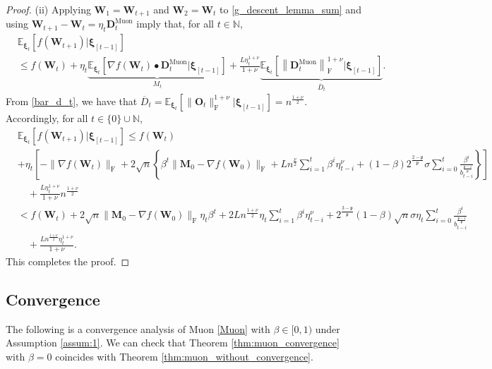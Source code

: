 \documentclass[twoside,11pt]{article}
\begin{document}
\begin{proof}
(ii) Applying $\bm{W}_1 = \bm{W}_{t+1}$ and $\bm{W}_2 = \bm{W}_t$ to \eqref{g_descent_lemma_sum} and using $\bm{W}_{t+1} - \bm{W}_t = \eta_t \bm{D}_t^{\mathrm{Muon}}$ imply that, for all $t \in \mathbb{N}$,
\begin{align*}
&\mathbb{E}_{\bm{\xi}_t} \left[ f(\bm{W}_{t+1})|\bm{\xi}_{[t-1]} \right]\\
&\leq 
f(\bm{W}_t) 
+ \eta_t 
\underbrace{\mathbb{E}_{\bm{\xi}_t} \left[ \nabla f (\bm{W}_t) \bullet \bm{D}_t^{\mathrm{Muon}} |\bm{\xi}_{[t-1]} \right]}_{M_t}
+ \frac{L \eta_t^{1 + \nu}}{1 + \nu} 
\underbrace{\mathbb{E}_{\bm{\xi}_t} \left[
\left\| \bm{D}_t^{\mathrm{Muon}} \right\|_{\mathrm{F}}^{1 + \nu} \Big| \bm{\xi}_{[t-1]} \right]}_{\overline{D}_t}.
\end{align*}
From \eqref{bar_d_t}, we have that $\overline{D}_t = \mathbb{E}_{\bm{\xi}_t} [ \| \bm{O}_t \|_{\mathrm{F}}^{1 + \nu} | \bm{\xi}_{[t-1]}] = n^{\frac{1 + \nu}{2}}$. Accordingly, for all $t \in \{0\} \cup \mathbb{N}$,
\begin{align}\label{ineq_muon}
&\mathbb{E}_{\bm{\xi}_t} \left[ f(\bm{W}_{t+1})|\bm{\xi}_{[t-1]} \right]
\leq 
f(\bm{W}_t) \nonumber\\
&+ \eta_t 
\left[ - \| \nabla f (\bm{W}_t) \|_{\mathrm{F}}
+ 2 \sqrt{n}
\left\{  
\beta^t \| \bm{M}_{0} - \nabla f(\bm{W}_{0}) \|_{\mathrm{F}}
+ L n^{\frac{\nu}{2}} \sum_{i=1}^t \beta^i \eta_{t-i}^\nu 
+ (1 - \beta) 2^{\frac{2 - \mathfrak{p}}{\mathfrak{p}}} \sigma
\sum_{i=0}^t 
\frac{\beta^i}{b_{t-i}^{\frac{\mathfrak{p} -1}{\mathfrak{p}}}}
\right\} \right] \nonumber\\ 
&\quad + \frac{L \eta_t^{1 + \nu}}{1 + \nu} 
n^{\frac{1 + \nu}{2}} \nonumber\\
&< 
f(\bm{W}_t)
+ 2 \sqrt{n} \| \bm{M}_{0} - \nabla f(\bm{W}_{0}) \|_{\mathrm{F}} \eta_t \beta^t
+ 2 L n^{\frac{1+\nu}{2}} \eta_t \sum_{i=1}^t \beta^i \eta_{t-i}^\nu
+ 2^{\frac{3 - \mathfrak{p}}{\mathfrak{p}}} (1 - \beta) \sqrt{n} \sigma \eta_t 
\sum_{i=0}^t 
\frac{\beta^i}{b_{t-i}^{\frac{\mathfrak{p} -1}{\mathfrak{p}}}} \nonumber\\
&\quad+
\frac{L n^{\frac{1 + \nu}{2}} \eta_t^{1 + \nu}}{1 + \nu}.  
\end{align}
This completes the proof.
\end{proof}

\subsection{Convergence}
The following is a convergence analysis of Muon \eqref{Muon} with $\beta \in [0,1)$ under Assumption \ref{assum:1}. We can check that Theorem \ref{thm:muon_convergence} with $\beta = 0$ coincides with Theorem \ref{thm:muon_without_convergence}.
\end{document}
